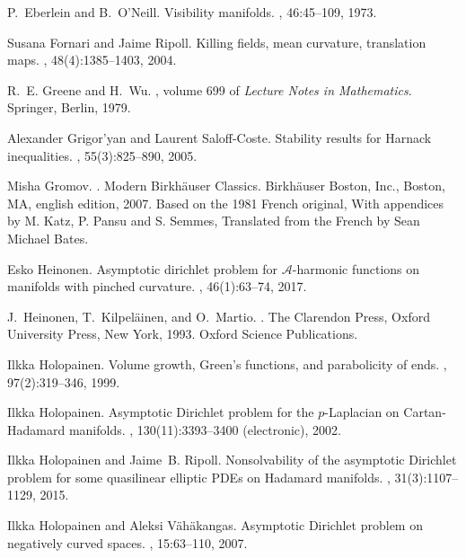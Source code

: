 \documentclass[10pt,a4paper,reqno]{amsart}
\numberwithin{equation}{section}
\theoremstyle{plain}
\theoremstyle{definition}
\begin{document}
\begin{thebibliography}{10}
P.~Eberlein and B.~O'Neill.
\newblock Visibility manifolds.
, 46:45--109, 1973.

Susana Fornari and Jaime Ripoll.
\newblock Killing fields, mean curvature, translation maps.
, 48(4):1385--1403, 2004.

R.~E. Greene and H.~Wu.
, volume 699
  of {\em Lecture Notes in Mathematics}.
\newblock Springer, Berlin, 1979.

Alexander Grigor'yan and Laurent Saloff-Coste.
\newblock Stability results for {H}arnack inequalities.
, 55(3):825--890, 2005.

Misha Gromov.
.
\newblock Modern Birkh\"auser Classics. Birkh\"auser Boston, Inc., Boston, MA,
  english edition, 2007.
\newblock Based on the 1981 French original, With appendices by M. Katz, P.
  Pansu and S. Semmes, Translated from the French by Sean Michael Bates.

Esko Heinonen.
\newblock Asymptotic dirichlet problem for {${\mathcal A}$}-harmonic functions
  on manifolds with pinched curvature.
, 46(1):63--74, 2017.

J.~Heinonen, T.~Kilpel{\"a}inen, and O.~Martio.
.
\newblock The Clarendon Press, Oxford University Press, New York, 1993.
\newblock Oxford Science Publications.

Ilkka Holopainen.
\newblock Volume growth, {G}reen's functions, and parabolicity of ends.
, 97(2):319--346, 1999.

Ilkka Holopainen.
\newblock Asymptotic {D}irichlet problem for the {$p$}-{L}aplacian on
  {C}artan-{H}adamard manifolds.
, 130(11):3393--3400 (electronic), 2002.

Ilkka Holopainen and Jaime~B. Ripoll.
\newblock Nonsolvability of the asymptotic {D}irichlet problem for some
  quasilinear elliptic {PDE}s on {H}adamard manifolds.
, 31(3):1107--1129, 2015.

Ilkka Holopainen and Aleksi V{\"a}h{\"a}kangas.
\newblock Asymptotic {D}irichlet problem on negatively curved spaces.
, 15:63--110, 2007.


\end{thebibliography}
\end{document}
